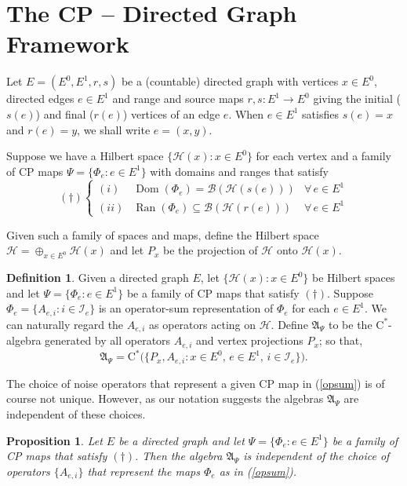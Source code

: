 \documentclass[12pt]{amsart}
\theoremstyle{plain}
\newtheorem{prop}[thm]{Proposition}
\theoremstyle{definition}
\newtheorem{defn}[thm]{Definition}
\newcommand{\ca}{\mathrm{C}^*}
\newcommand{\B}{{\mathcal{B}}}
\renewcommand{\H}{{\mathcal{H}}}
\newcommand{\I}{{\mathcal{I}}}
\newcommand{\fA}{{\mathfrak{A}}}
\newcommand{\dom}{\operatorname{Dom}}
\newcommand{\ran}{\operatorname{Ran}}
\renewcommand{\dom}{\operatorname{Dom}}
\begin{document}
\section{The CP -- Directed Graph Framework}   \label{S:cpgraph}


Let $E=(E^0,E^1,r,s)$ be a (countable) directed graph with
vertices $x\in E^0$, directed edges $e\in E^1$ and range and
source maps $r,s: E^1\rightarrow E^0$ giving the initial ($s(e)$)
and final ($r(e)$) vertices of an edge $e$.  When $e\in E^1$
satisfies $s(e)=x$ and $r(e)=y$, we shall write $e=(x,y)$.

Suppose we have a Hilbert space $\{\H(x):x\in E^0\}$ for each
vertex and a family of CP maps $\Psi=\{\Phi_e:e\in E^1\}$ with
domains and ranges that satisfy
\[
(\dagger)\left\{
\begin{array}{lll}
(i) & \dom(\Phi_e) = \B(\H(s(e))) & \mbox{$\forall\, e \in E^1$} \\
(ii) & \ran(\Phi_e) \subseteq \B(\H(r(e))) & \mbox{$\forall\, e\in
E^1$}
\end{array}\right.
\]

Given such a family of spaces and maps, define the Hilbert space
$\H = \oplus_{x\in E^0} \H(x)$ and let $P_x$ be the projection of
$\H$ onto $\H(x)$.

\begin{defn}
Given a directed graph $E$, let $\{\H(x):x\in E^0\}$ be Hilbert
spaces and let $\Psi=\{\Phi_e: e\in E^1\}$ be a family of CP maps
that satisfy $(\dagger)$. Suppose $\Phi_e = \{A_{e,i}:i\in\I_e\}$
is an operator-sum representation of $\Phi_e$ for each $e\in E^1$.
We can naturally regard the $A_{e,i}$ as operators acting on $\H$.
Define $\fA_\Psi$ to be the $\ca$-algebra generated by all
operators $A_{e,i}$ and vertex projections $P_x$; so that,
\[
\fA_\Psi = \ca \big( \{ P_x, A_{e,i} : x\in E^0,\, e\in E^1, \,
i\in\I_e\}\big).
\]
\end{defn}

The choice of noise operators that represent a given CP map in
(\ref{opsum}) is of course not unique. However, as our notation
suggests the algebras $\fA_\Psi$ are independent of these choices.

\begin{prop}
Let $E$ be a directed graph and let $\Psi= \{\Phi_e:e\in E^1\}$ be
a family of CP maps that satisfy $(\dagger)$. Then the algebra
$\fA_\Psi$ is independent of the choice of operators $\{A_{e,i}\}$
that represent the maps $\Phi_e$ as in (\ref{opsum}).
\end{prop}
\end{document}
